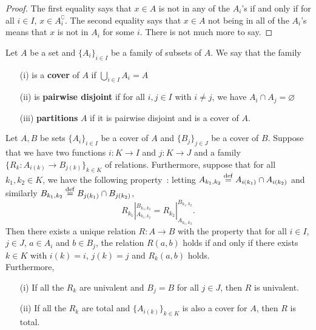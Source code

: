 \begin{proof}
	The first equality says that $x \in A$ is not in any of the $A_i$'s if and only if for all $i \in I$, $x \in A_i^{\complement}$. The second equality says that $x \in A$ not being in all of the $A_i$'s means that $x$ is not in $A_i$ for some $i$. There is not much more to say.
\end{proof}

\begin{definition} %
	Let $A$ be a set and $\{A_i\}_{i \in I}$ be a family of subsets of $A$. We say that the family 
	\\
	\begin{itemize}
		\item[(i)] is a \textbf{cover} of $A$ if $\bigcup_{i \in I} A_i = A$
		\\

		\item[(ii)] is \textbf{pairwise disjoint} if for all $i,j \in I$ with $i \neq j$, we have $A_i \cap A_j = \varnothing$
		\\

		\item[(iii)] \textbf{partitions} $A$ if it is pairwise disjoint and is a cover of $A$.
		\\

	\end{itemize}
\end{definition}

\begin{proposition} \label{glueing-relations}
	Let $A,B$ be sets $\{A_i\}_{i \in I}$ be a cover of $A$ and $\{B_j\}_{j \in J}$ be a cover of $B$. Suppose that we have two functions $i : K \to I$ and $j : K \to J$ and a family $\{R_k : A_{i(k)} \to B_{j(k)}\}_{k \in K}$ of relations. Furthermore, suppose that for all $k_1,k_2 \in K$, we have the following property~: letting $A_{k_1,k_2} \overset{\mathrm{def}}{=} A_{i(k_1)} \cap A_{i(k_2)}$ and similarly $B_{k_1,k_2} \overset{\mathrm{def}}{=} B_{j(k_1)} \cap B_{j(k_2)}$, 
	\[
		R_{k_1}|_{A_{k_1,k_2}}^{B_{k_1,k_2}} = R_{k_2}|_{A_{k_1,k_2}}^{B_{k_1,k_2}}.
	\]
	Then there exists a unique relation $R : A \to B$ with the property that for all $i \in I$, $j \in J$, $a \in A_i$ and $b \in B_j$, the relation $R(a,b)$ holds if and only if there exists $k \in K$ with $i(k) = i$, $j(k) = j$ and $R_k(a,b)$ holds. 
	\\

	Furthermore,
	\begin{itemize}
		\item[(i)] If all the $R_k$ are univalent and $B_j = B$ for all $j \in J$, then $R$ is univalent.
		\item[(ii)] If all the $R_k$ are total and $\{A_{i(k)}\}_{k \in K}$ is also a cover for $A$, then $R$ is total.
	\end{itemize}
\end{proposition}

